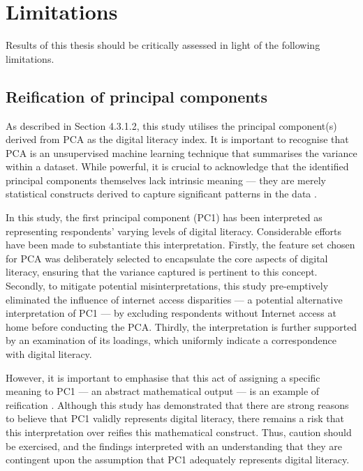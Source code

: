 \section{Limitations}
Results of this thesis should be critically assessed in light of the following limitations.

\subsection{Reification of principal components}
As described in Section 4.3.1.2, this study utilises the principal component(s) derived from PCA as the digital literacy index. It is important to recognise that PCA is an unsupervised machine learning technique that summarises the variance within a dataset. While powerful, it is crucial to acknowledge that the identified principal components themselves lack intrinsic meaning — they are merely statistical constructs derived to capture significant patterns in the data \parencite[p. 509]{james_introduction_2023}.

In this study, the first principal component (PC1) has been interpreted as representing respondents' varying levels of digital literacy. Considerable efforts have been made to substantiate this interpretation. Firstly, the feature set chosen for PCA was deliberately selected to encapsulate the core aspects of digital literacy, ensuring that the variance captured is pertinent to this concept. Secondly, to mitigate potential misinterpretations, this study pre-emptively eliminated the influence of internet access disparities — a potential alternative interpretation of PC1 — by excluding respondents without Internet access at home before conducting the PCA. Thirdly, the interpretation is further supported by an examination of its loadings, which uniformly indicate a correspondence with digital literacy.

However, it is important to emphasise that this act of assigning a specific meaning to PC1 — an abstract mathematical output — is an example of reification \parencite{jolliffe_rotation_2002}. Although this study has demonstrated that there are strong reasons to believe that PC1 validly represents digital literacy, there remains a risk that this interpretation over reifies this mathematical construct. Thus, caution should be exercised, and the findings interpreted with an understanding that they are contingent upon the assumption that PC1 adequately represents digital literacy.

